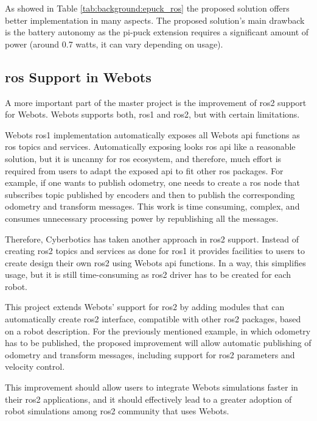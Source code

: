 As showed in Table \ref{tab:background:epuck_ros} the proposed solution offers better implementation in many aspects. The proposed solution's main drawback is the battery autonomy as the pi-puck extension requires a significant amount of power (around 0.7 watts, it can vary depending on usage).


\subsection{\ac{ros} Support in Webots}
A more important part of the master project is the improvement of \ac{ros2} support for Webots. Webots supports both, \ac{ros}1 and \ac{ros2}, but with certain limitations.

Webots \ac{ros}1 implementation automatically exposes all Webots \ac{api} functions as \ac{ros} topics and services.
Automatically exposing looks \ac{ros} \ac{api} like a reasonable solution, but it is uncanny for \ac{ros} ecosystem, and therefore, much effort is required from users to adapt the exposed \ac{api} to fit other \ac{ros} packages. For example, if one wants to publish odometry, one needs to create a \ac{ros} node that subscribes topic published by encoders and then to publish the corresponding odometry and transform messages. This work is time consuming, complex, and consumes unnecessary processing power by republishing all the messages.

Therefore, Cyberbotics has taken another approach in \ac{ros2} support. Instead of creating \ac{ros2} topics and services as done for \ac{ros}1 it provides facilities to users to create design their own \ac{ros2} using Webots \ac{api} functions. In a way, this simplifies usage, but it is still time-consuming as \ac{ros2} driver has to be created for each robot.

This project extends Webots' support for \ac{ros2} by adding modules that can automatically create \ac{ros2} interface, compatible with other \ac{ros2} packages, based on a robot description. For the previously mentioned example, in which odometry has to be published, the proposed improvement will allow automatic publishing of odometry and transform messages, including support for \ac{ros2} parameters and velocity control.

This improvement should allow users to integrate Webots simulations faster in their \ac{ros2} applications, and it should effectively lead to a greater adoption of robot simulations among \ac{ros2} community that uses Webots.
